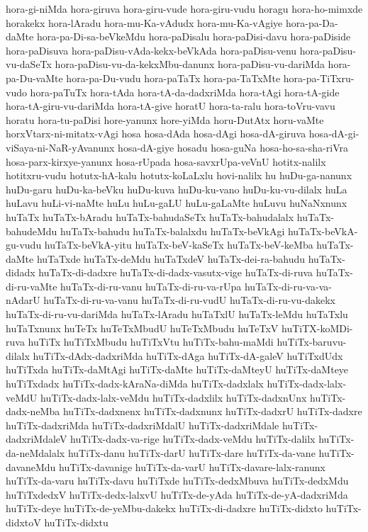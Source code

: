 {hora-gi-niMda
hora-giruva
hora-giru-vude
hora-giru-vudu
horagu
hora-ho-mimxde
horakekx
hora-lAradu
hora-mu-Ka-vAdudx
hora-mu-Ka-vAgiye
hora-pa-Da-daMte
hora-pa-Di-sa-beVkeMdu
hora-paDisalu
hora-paDisi-davu
hora-paDiside
hora-paDisuva
hora-paDisu-vAda-kekx-beVkAda
hora-paDisu-venu
hora-paDisu-vu-daSeTx
hora-paDisu-vu-da-kekxMbu-danunx
hora-paDisu-vu-dariMda
hora-pa-Du-vaMte
hora-pa-Du-vudu
hora-paTaTx
hora-pa-TaTxMte
hora-pa-TiTxru-vudo
hora-paTuTx
hora-tAda
hora-tA-da-dadxriMda
hora-tAgi
hora-tA-gide
hora-tA-giru-vu-dariMda
hora-tA-give
horatU
hora-ta-ralu
hora-toVru-vavu
horatu
hora-tu-paDisi
hore-yanunx
hore-yiMda
horu-DutAtx
horu-vaMte
horxVtarx-ni-mitatx-vAgi
hosa
hosa-dAda
hosa-dAgi
hosa-dA-giruva
hosa-dA-gi-viSaya-ni-NaR-yAvanunx
hosa-dA-giye
hosadu
hosa-guNa
hosa-ho-sa-sha-riVra
hosa-parx-kirxye-yanunx
hosa-rUpada
hosa-savxrUpa-veVnU
hotitx-nalilx
hotitxru-vudu
hotutx-hA-kalu
hotutx-koLaLxlu
hovi-nalilx
hu
huDu-ga-nanunx
huDu-garu
huDu-ka-beVku
huDu-kuva
huDu-ku-vano
huDu-ku-vu-dilalx
huLa
huLavu
huLi-vi-naMte
huLu
huLu-gaLU
huLu-gaLaMte
huLuvu
huNaNxnunx
huTaTx
huTaTx-bAradu
huTaTx-bahudaSeTx
huTaTx-bahudalalx
huTaTx-bahudeMdu
huTaTx-bahudu
huTaTx-balalxdu
huTaTx-beVkAgi
huTaTx-beVkA-gu-vudu
huTaTx-beVkA-yitu
huTaTx-beV-kaSeTx
huTaTx-beV-keMba
huTaTx-daMte
huTaTxde
huTaTx-deMdu
huTaTxdeV
huTaTx-dei-ra-bahudu
huTaTx-didadx
huTaTx-di-dadxre
huTaTx-di-dadx-vasutx-vige
huTaTx-di-ruva
huTaTx-di-ru-vaMte
huTaTx-di-ru-vanu
huTaTx-di-ru-va-rUpa
huTaTx-di-ru-va-va-nAdarU
huTaTx-di-ru-va-vanu
huTaTx-di-ru-vudU
huTaTx-di-ru-vu-dakekx
huTaTx-di-ru-vu-dariMda
huTaTx-lAradu
huTaTxlU
huTaTx-leMdu
huTaTxlu
huTaTxnunx
huTeTx
huTeTxMbudU
huTeTxMbudu
huTeTxV
huTiTX-koMDi-ruva
huTiTx
huTiTxMbudu
huTiTxVtu
huTiTx-bahu-maMdi
huTiTx-baruvu-dilalx
huTiTx-dAdx-dadxriMda
huTiTx-dAga
huTiTx-dA-galeV
huTiTxdUdx
huTiTxda
huTiTx-daMtAgi
huTiTx-daMte
huTiTx-daMteyU
huTiTx-daMteye
huTiTxdadx
huTiTx-dadx-kAraNa-diMda
huTiTx-dadxlalx
huTiTx-dadx-lalx-veMdU
huTiTx-dadx-lalx-veMdu
huTiTx-dadxlilx
huTiTx-dadxnUnx
huTiTx-dadx-neMba
huTiTx-dadxnenx
huTiTx-dadxnunx
huTiTx-dadxrU
huTiTx-dadxre
huTiTx-dadxriMda
huTiTx-dadxriMdalU
huTiTx-dadxriMdale
huTiTx-dadxriMdaleV
huTiTx-dadx-va-rige
huTiTx-dadx-veMdu
huTiTx-dalilx
huTiTx-da-neMdalalx
huTiTx-danu
huTiTx-darU
huTiTx-dare
huTiTx-da-vane
huTiTx-davaneMdu
huTiTx-davanige
huTiTx-da-varU
huTiTx-davare-lalx-ranunx
huTiTx-da-varu
huTiTx-davu
huTiTxde
huTiTx-dedxMbuva
huTiTx-dedxMdu
huTiTxdedxV
huTiTx-dedx-lalxvU
huTiTx-de-yAda
huTiTx-de-yA-dadxriMda
huTiTx-deye
huTiTx-de-yeMbu-dakekx
huTiTx-di-dadxre
huTiTx-didxto
huTiTx-didxtoV
huTiTx-didxtu
}
